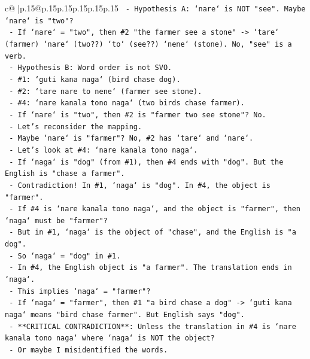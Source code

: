 \documentclass{article}
\begin{document}
{\begin{supertabular}{c@{$\;$}|p{.15\linewidth}@{}p{.15\linewidth}p{.15\linewidth}p{.15\linewidth}p{.15\linewidth}p{.15\linewidth}}
{{{\texttt{         {-} Hypothesis A: `nare` is NOT "see". Maybe `nare` is "two"?} \\
\texttt{           {-} If `nare` = "two", then \#2 "the farmer see a stone" {-}> `tare` (farmer) `nare` (two??) `to` (see??) `nene` (stone). No, "see" is a verb.} \\
\texttt{         {-} Hypothesis B: Word order is not SVO.} \\
\texttt{           {-} \#1: `guti kana naga` (bird chase dog).} \\
\texttt{           {-} \#2: `tare nare to nene` (farmer see stone).} \\
\texttt{           {-} \#4: `nare kanala tono naga` (two birds chase farmer).} \\
\texttt{           {-} If `nare` is "two", then \#2 is "farmer two see stone"? No.} \\
\texttt{           {-} Let's reconsider the mapping.} \\
\texttt{           {-} Maybe `nare` is "farmer"? No, \#2 has `tare` and `nare`.} \\
\texttt{           {-} Let's look at \#4: `nare kanala tono naga`.} \\
\texttt{             {-} If `naga` is "dog" (from \#1), then \#4 ends with "dog". But the English is "chase a farmer".} \\
\texttt{             {-} Contradiction! In \#1, `naga` is "dog". In \#4, the object is "farmer".} \\
\texttt{             {-} If \#4 is `nare kanala tono naga`, and the object is "farmer", then `naga` must be "farmer"?} \\
\texttt{             {-} But in \#1, `naga` is the object of "chase", and the English is "a dog".} \\
\texttt{             {-} So `naga` = "dog" in \#1.} \\
\texttt{             {-} In \#4, the English object is "a farmer". The translation ends in `naga`.} \\
\texttt{             {-} This implies `naga` = "farmer"?} \\
\texttt{             {-} If `naga` = "farmer", then \#1 "a bird chase a dog" {-}> `guti kana naga` means "bird chase farmer". But English says "dog".} \\
\texttt{             {-} **CRITICAL CONTRADICTION**: Unless the translation in \#4 is `nare kanala tono naga` where `naga` is NOT the object?} \\
\texttt{             {-} Or maybe I misidentified the words.} \\
}}}
\end{supertabular}}
\end{document}
